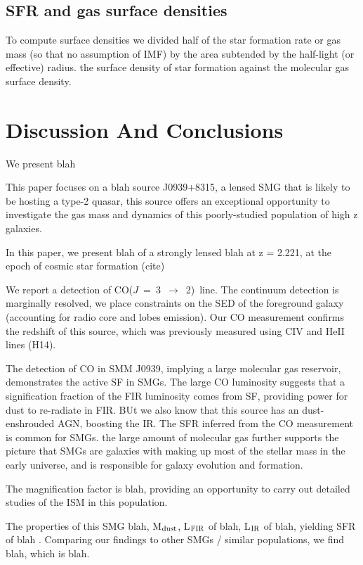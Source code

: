 \documentclass[twocolumn,apj,numberedappendix]{emulateapj}
\newcommand{\CO}{\mbox{CO($J$ = 3 $\rightarrow$ 2) }}
\begin{document}
\subsection{SFR and gas surface densities}
To compute surface densities we divided half of the star formation rate or gas mass (so that no assumption of IMF) by the area subtended by the half-light (or effective) radius.
 the surface density of star formation against the molecular gas surface density. 


\section{Discussion And Conclusions} \label{sec:conclusions}
We present blah

This paper focuses on a blah source J0939+8315, a lensed SMG that is likely to be hosting a type-2 quasar, this source offers an exceptional opportunity to
investigate the gas mass and dynamics of this
poorly-studied population of high z galaxies.

In this paper, we present blah of a strongly lensed blah at z = 2.221, at the epoch of cosmic star formation (cite)

We report a detection of \CO line.
The continuum detection is marginally resolved, we place constraints on the SED of the foreground galaxy (accounting for radio 
core and lobes emission). Our CO measurement confirms the redshift of this source, which was previously measured using CIV and HeII lines (H14).

The detection of CO in SMM J0939, implying a large molecular gas reservoir, demonstrates the active SF in SMGs. 
The large CO luminosity suggests that a signification fraction of the FIR luminosity comes from SF, providing power for dust to re-radiate in FIR. BUt we also know that this source has an dust-enshrouded AGN, boosting the IR.
The SFR inferred from the CO measurement is common for SMGs. the large amount of molecular gas further supports the picture that SMGs are galaxies with making up most of the stellar mass in the early universe, and is responsible for galaxy evolution and formation. 

The magnification factor is blah, providing an opportunity to carry out detailed studies of the ISM in this population.

The properties of this SMG blah, M$_{\rm dust}$, L$_{\rm FIR}$ of blah, L$_{\rm IR}$ of blah, yielding SFR of 
blah . Comparing our findings to other SMGs / similar populations, we find blah, which is blah.
\end{document}
